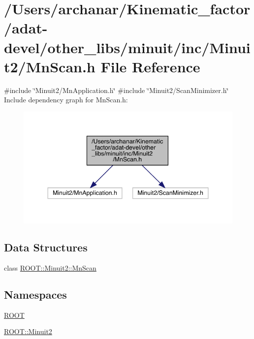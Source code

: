 \hypertarget{adat-devel_2other__libs_2minuit_2inc_2Minuit2_2MnScan_8h}{}\section{/\+Users/archanar/\+Kinematic\+\_\+factor/adat-\/devel/other\+\_\+libs/minuit/inc/\+Minuit2/\+Mn\+Scan.h File Reference}
\label{adat-devel_2other__libs_2minuit_2inc_2Minuit2_2MnScan_8h}
{\ttfamily \#include \char`\"{}Minuit2/\+Mn\+Application.\+h\char`\"{}}\newline
{\ttfamily \#include \char`\"{}Minuit2/\+Scan\+Minimizer.\+h\char`\"{}}\newline
Include dependency graph for Mn\+Scan.\+h\+:
\nopagebreak
\begin{figure}[H]
\begin{center}
\leavevmode
\includegraphics[width=344pt]{dc/d0a/adat-devel_2other__libs_2minuit_2inc_2Minuit2_2MnScan_8h__incl}
\end{center}
\end{figure}
\subsection*{Data Structures}
\begin{DoxyCompactItemize}
\item 
class \mbox{\hyperlink{classROOT_1_1Minuit2_1_1MnScan}{R\+O\+O\+T\+::\+Minuit2\+::\+Mn\+Scan}}
\end{DoxyCompactItemize}
\subsection*{Namespaces}
\begin{DoxyCompactItemize}
\item 
 \mbox{\hyperlink{namespaceROOT}{R\+O\+OT}}
\item 
 \mbox{\hyperlink{namespaceROOT_1_1Minuit2}{R\+O\+O\+T\+::\+Minuit2}}
\end{DoxyCompactItemize}
